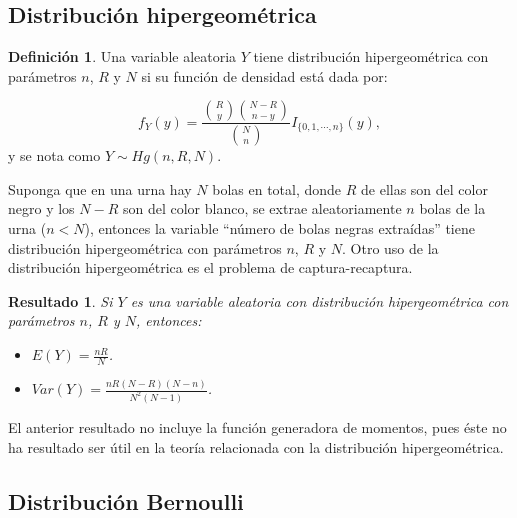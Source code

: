 \documentclass[
  10pt,
  spanish,
]{book}
\providecommand{\tightlist}{%
  \setlength{\itemsep}{0pt}\setlength{\parskip}{0pt}}
\newtheorem{proposition}{Resultado}[chapter]
\theoremstyle{definition}
\newtheorem{definition}{Definición}[chapter]
\theoremstyle{definition}
\theoremstyle{definition}
\theoremstyle{definition}
\theoremstyle{remark}
\begin{document}
\hypertarget{distribuciuxf3n-hipergeomuxe9trica}{%
\subsection{Distribución hipergeométrica}\label{distribuciuxf3n-hipergeomuxe9trica}}

\begin{definition}
\protect\hypertarget{def:unnamed-chunk-3}{}{\label{def:unnamed-chunk-3} }Una variable aleatoria \(Y\) tiene distribución hipergeométrica con parámetros \(n\), \(R\) y \(N\) si su función de densidad está dada por:

\begin{equation}
f_Y(y)=\frac{\binom{R}{y}\binom{N-R}{n-y}}{\binom{N}{n}}I_{\{0,1,\cdots,n\}}(y),
\end{equation}
y se nota como \(Y\sim Hg(n,R,N)\).
\end{definition}

Suponga que en una urna hay \(N\) bolas en total, donde \(R\) de ellas son del color negro y los \(N-R\) son del color blanco, se extrae aleatoriamente
\(n\) bolas de la urna (\(n<N\)), entonces la variable ``número de bolas negras extraídas'' tiene distribución hipergeométrica con parámetros \(n\), \(R\) y
\(N\). Otro uso de la distribución hipergeométrica es el problema de captura-recaptura.

\begin{proposition}
\protect\hypertarget{prp:unnamed-chunk-4}{}{\label{prp:unnamed-chunk-4} }Si \(Y\) es una variable aleatoria con distribución hipergeométrica con parámetros \(n\), \(R\) y \(N\), entonces:

\begin{itemize}
\tightlist
\item
  \(E(Y)=\frac{nR}{N}\).
\item
  \(Var(Y)=\frac{nR(N-R)(N-n)}{N^2(N-1)}\).
\end{itemize}
\end{proposition}

El anterior resultado no incluye la función generadora de momentos, pues éste no ha resultado ser útil en la teoría relacionada con la distribución hipergeométrica.

\hypertarget{distribuciuxf3n-bernoulli}{%
\subsection{Distribución Bernoulli}\label{distribuciuxf3n-bernoulli}}
\end{document}
